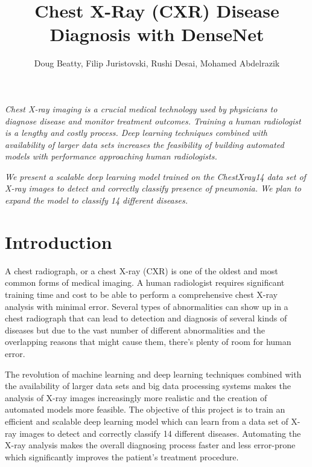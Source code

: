 \documentclass{amia}
\begin{document}
\title{Chest X-Ray (CXR) Disease Diagnosis with DenseNet}

\author{Doug Beatty, Filip Juristovski, Rushi Desai, Mohamed Abdelrazik}


\maketitle


\textit{Chest X-ray imaging \cite{ref1} is a crucial medical technology used by physicians to diagnose disease and monitor treatment outcomes. Training a human radiologist is a lengthy and costly process. Deep learning techniques combined with availability of larger data sets increases the feasibility of building automated models with performance approaching human radiologists.}

\textit{We present a scalable deep learning model trained on the ChestXray14 \cite{ref7} data set of X-ray images to detect and correctly classify presence of pneumonia. We plan to expand the model to classify 14 different diseases.}

\section*{Introduction}
A chest radiograph\cite{ref1}, or a chest X-ray (CXR) is one of the oldest and most common forms of medical imaging. A human radiologist requires significant training time and cost to be able to perform a comprehensive chest X-ray analysis with minimal error. Several types of abnormalities can show up in a chest radiograph that can lead to detection and diagnosis of several kinds of diseases but due to the vast number of different abnormalities and the overlapping reasons that might cause them, there’s plenty of room for human error.

The revolution of machine learning and deep learning techniques combined with the availability of larger data sets\cite{ref2} and big data processing systems\cite{ref3} makes the analysis of X-ray images increasingly more realistic and the creation of automated models more feasible. The objective of this project is to train an efficient and scalable deep learning model which can learn from a data set of X-ray images to detect and correctly classify 14 different diseases. Automating the X-ray analysis makes the overall diagnosing process faster and less error-prone which significantly improves the patient’s treatment procedure.
\end{document}
